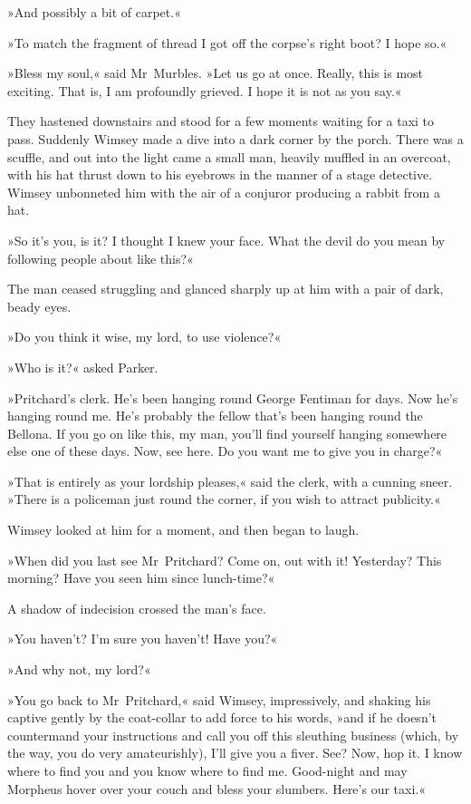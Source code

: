 »And possibly a bit of carpet.«

»To match the fragment of thread I got off the corpse's right boot? I hope so.«

»Bless my soul,« said Mr~Murbles. »Let us go at once. Really, this is most exciting. That is, I am profoundly grieved. I hope it is not as you say.«

They hastened downstairs and stood for a few moments waiting for a taxi to pass. Suddenly Wimsey made a dive into a dark corner by the porch. There was a scuffle, and out into the light came a small man, heavily muffled in an overcoat, with his hat thrust down to his eyebrows in the manner of a stage detective. Wimsey unbonneted him with the air of a conjuror producing a rabbit from a hat.

»So it's you, is it? I thought I knew your face. What the devil do you mean by following people about like this?«

The man ceased struggling and glanced sharply up at him with a pair of dark, beady eyes.

»Do you think it wise, my lord, to use violence?«

»Who is it?« asked Parker.

»Pritchard's clerk. He's been hanging round George Fentiman for days. Now he's hanging round me. He's probably the fellow that's been hanging round the Bellona. If you go on like this, my man, you'll find yourself hanging somewhere else one of these days. Now, see here. Do you want me to give you in charge?«

»That is entirely as your lordship pleases,« said the clerk, with a cunning sneer. »There is a policeman just round the corner, if you wish to attract publicity.«

Wimsey looked at him for a moment, and then began to laugh.

»When did you last see Mr~Pritchard? Come on, out with it! Yesterday? This morning? Have you seen him since lunch-time?«

A shadow of indecision crossed the man's face.

»You haven't? I'm sure you haven't! Have you?«

»And why not, my lord?«

»You go back to Mr~Pritchard,« said Wimsey, impressively, and shaking his captive gently by the coat-collar to add force to his words, »and if he doesn't countermand your instructions and call you off this sleuthing business (which, by the way, you do very amateurishly), I'll give you a fiver. See? Now, hop it. I know where to find you and you know where to find me. Good-night and may Morpheus hover over your couch and bless your slumbers. Here's our taxi.«

